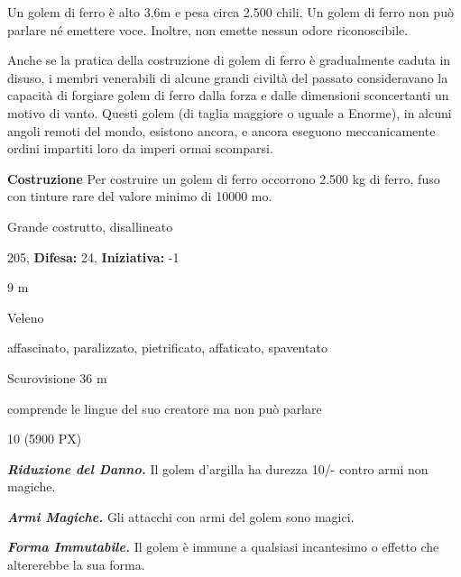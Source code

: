 \begin{multicols}{2}
{Un golem di ferro è alto 3,6m e pesa circa 2.500 chili. Un golem di ferro non può parlare né emettere voce. Inoltre, non emette nessun odore riconoscibile.

Anche se la pratica della costruzione di golem di ferro è gradualmente caduta in disuso, i membri venerabili di alcune grandi civiltà del passato consideravano la capacità di forgiare golem di ferro dalla forza e dalle dimensioni sconcertanti un motivo di vanto. Questi golem (di taglia maggiore o uguale a Enorme), in alcuni angoli remoti del mondo, esistono ancora, e ancora eseguono meccanicamente ordini impartiti loro da imperi ormai scomparsi.

\textbf{Costruzione}
Per costruire un golem di ferro occorrono 2.500 kg di ferro, fuso con tinture rare del valore minimo di 10000 mo.

\noindent
\begin{description}[noitemsep, topsep=0pt, parsep=0pt, partopsep=0pt, leftmargin=0cm, labelwidth=2.2cm]
	\item[\textbf{Taglia/Tipo:}] Grande costrutto, disallineato
	\item[\textbf{Caratt.:}] 
	\item[\textbf{Punti Ferita:}] 205,  \textbf{Difesa:} 24,  \textbf{Iniziativa:} -1
	\item[\textbf{Movimento:}] 9 m
	\item[\textbf{Tiri Salvez.:}] 
	\item[\textbf{Imm. Danni:}] Veleno
	\item[\textbf{Immunità:}] affascinato, paralizzato, pietrificato, affaticato, spaventato
	\item[\textbf{Sensi:}] Scurovisione 36 m
	\item[\textbf{Linguaggi:}] comprende le lingue del suo creatore ma non può parlare
	\item[\textbf{Sfida:}] 10 (5900 PX)\smallskip
\end{description}

\emph{\textbf{Riduzione del Danno.}} Il golem d'argilla ha durezza 10/- contro armi non magiche.

\emph{\textbf{Armi Magiche.}} Gli attacchi con armi del golem sono magici.

\emph{\textbf{Forma Immutabile.}} Il golem è immune a qualsiasi incantesimo o effetto che altererebbe la sua forma.

}
\end{multicols}
